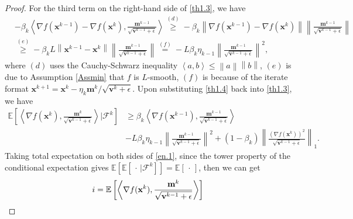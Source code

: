 \documentclass[twoside,11pt]{article}
\begin{document}
\begin{proof}
\par For the third term on the right-hand side of \eqref{th1.3},  we have
\begin{equation}\label{th1.4}
   	\begin{aligned}
   	&-\beta_k\left\langle \nabla f(\mathbf{x}^{k-1})-\nabla f(\mathbf{x}^k),\frac{ \mathbf{m}^{k-1}}{\sqrt{\mathbf{v}^{k-1}+\epsilon}}\right\rangle
   	\overset{(d)}{\ge}-\beta_k\left\|  \nabla f(\mathbf{x}^{k-1})-\nabla f(\mathbf{x}^k)\right\| \left\| \frac{ \mathbf{m}^{k-1}}{\sqrt{\mathbf{v}^{k-1}+\epsilon}}\right\| \\
   	&\overset{(e)}{\ge}
   	-\beta_k L\left\|   \mathbf{x}^{k-1}-\mathbf{x}^k\right\| \left\| \frac{ \mathbf{m}^{k-1}}
   	{\sqrt{\mathbf{v}^{k-1}+\epsilon}}
   	\right\| 
   	\overset{(f)}{=}-L\beta_k \eta_{k-1}\left\| \frac{ \mathbf{m}^{k-1}}{\sqrt{\mathbf{v}^{k-1}+\epsilon}}\right\|^2,
   	\end{aligned}
\end{equation}
where $(d)$ uses the Cauchy-Schwarz inequality $\left\langle a,b\right \rangle \le\left\| a\right\| \left\| b\right\| $, $(e)$ is due to Assumption \ref {Assmin} that $f$ is $L$-smooth, $(f)$ is because of the iterate format   $\mathbf{x}^{k+1}=\mathbf{x}^k-\eta_k{\mathbf{m}^k}/{\sqrt{{\mathbf{v}}^k+\epsilon}}$. Upon substituting \eqref{th1.4} back into \eqref{th1.3}, we have
\begin{equation}\label{en.1}
   	\begin{aligned}
   	\mathbb{E}\left[ \left\langle \nabla f(\mathbf{x}^k),\frac{\mathbf{m}^k}{\sqrt{\mathbf{v}^{k-1}+\epsilon}}\right\rangle \bigg| \mathcal{F}^k\right]
   	&\ge \beta_k\left\langle \nabla f(\mathbf{x}^{k-1}),\frac{ \mathbf{m}^{k-1}}{\sqrt{\mathbf{v}^{k-1}+\epsilon}}\right\rangle\\
   	&-L\beta_k \eta_{k-1}\left\| \frac{ \mathbf{m}^{k-1}}{\sqrt{\mathbf{v}^{k-1}+\epsilon}}\right\|^2
   	+(1-\beta_k)\left\| \frac{(\nabla f(\mathbf{x}^k))^2 }{\sqrt{\mathbf{v}^{k-1}+\epsilon}}\right\|_1.
   	\end{aligned}
\end{equation} 
Taking total expectation on both sides of \eqref{en.1}, since the tower property of the conditional expectation gives $\mathbb{E}[\mathbb{E}[\,\cdot\,|\mathcal{F}^k]]=\mathbb{E}[\,\cdot\,]$, then we can get
\begin{equation}\label{th1.5}
   	\begin{aligned}
   	\uppercase\expandafter
   	{\romannumeral1}
   	&=\mathbb{E}\left[ \left\langle \nabla f(\mathbf{x}^k),\frac{\mathbf{m}^k}{\sqrt{\mathbf{v}^{k-1}+\epsilon}}\right\rangle\right]

\end{aligned}
\end{equation}
\end{proof}
\end{document}
